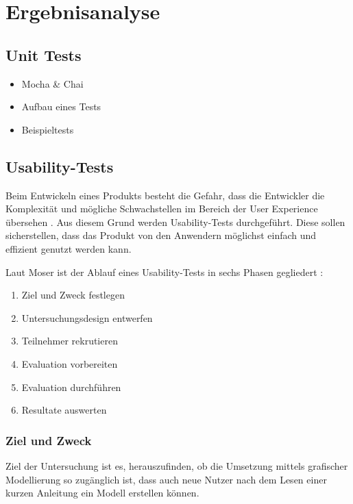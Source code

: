
\chapter{Ergebnisanalyse}

\section{Unit Tests}

\begin{itemize}
    \item Mocha \& Chai
    \item Aufbau eines Tests
    \item Beispieltests
\end{itemize}

\section{Usability-Tests}

Beim Entwickeln eines Produkts besteht die Gefahr, dass die Entwickler die Komplexität und mögliche Schwachstellen im Bereich der User Experience übersehen \cite{Witte2018}. Aus diesem Grund werden Usability-Tests durchgeführt. Diese sollen sicherstellen, dass das Produkt von den Anwendern möglichst einfach und effizient genutzt werden kann.

Laut Moser ist der Ablauf eines Usability-Tests in sechs Phasen gegliedert \cite{Moser2012}:
\begin{enumerate}
    \item Ziel und Zweck festlegen
    \item Untersuchungsdesign entwerfen
    \item Teilnehmer rekrutieren
    \item Evaluation vorbereiten
    \item Evaluation durchführen
    \item Resultate auswerten
\end{enumerate}

\subsection{Ziel und Zweck}
Ziel der Untersuchung ist es, herauszufinden, ob die Umsetzung mittels grafischer Modellierung so zugänglich ist, dass auch neue Nutzer nach dem Lesen einer kurzen Anleitung ein Modell erstellen können.

